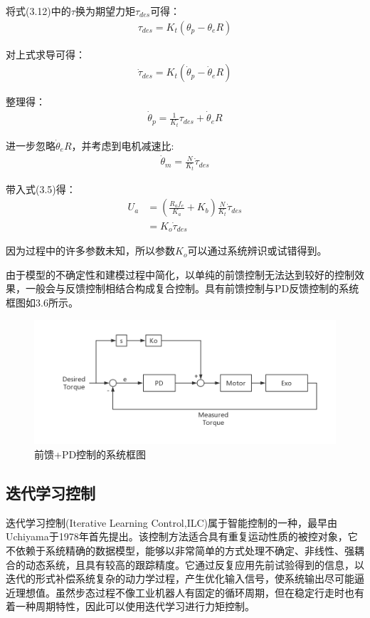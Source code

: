 将式(3.12)中的$\tau$换为期望力矩$\tau_{des}$可得：
\begin{align}
    \tau_{des} = K_t(\theta_p - \theta_eR)
\end{align}

对上式求导可得：
\begin{align}
    \dot\tau_{des} = K_t(\dot\theta_p - \dot\theta_e R)
\end{align}

整理得：
\begin{align}
    \dot\theta_p = \frac{1}{K_t}\tau_{des} + \dot\theta_e R
\end{align}

进一步忽略$\dot\theta_e R$，并考虑到电机减速比:
\begin{align}
    \dot\theta_m = \frac{N}{K_t}\dot\tau_{des}
\end{align}

带入式(3.5)得：
\begin{align}
    U_a &= \left(\frac{R_{a} f_{e}}{K_{a}}+K_{b}\right) \frac{N}{K_t} \dot\tau_{des} \\
        &= K_o \dot\tau_{des}
\end{align}

因为过程中的许多参数未知，所以参数$K_o$可以通过系统辨识或试错得到。

由于模型的不确定性和建模过程中简化，以单纯的前馈控制无法达到较好的控制效果，一般会与反馈控制相结合构成复合控制。具有前馈控制与PD反馈控制的系统框图如3.6所示。
\begin{figure}[htb]
    \includegraphics[width=15cm]{fig/f55.jpg}
    \caption{前馈+PD控制的系统框图}
    \label{fig:mark}
\end{figure}

\subsection{迭代学习控制}

迭代学习控制(Iterative Learning Control,ILC)属于智能控制的一种，最早由Uchiyama\cite{p46}于1978年首先提出。该控制方法适合具有重复运动性质的被控对象，它不依赖于系统精确的数据模型，能够以非常简单的方式处理不确定、非线性、强耦合的动态系统，且具有较高的跟踪精度。它通过反复应用先前试验得到的信息，以迭代的形式补偿系统复杂的动力学过程，产生优化输入信号，使系统输出尽可能逼近理想值。虽然步态过程不像工业机器人有固定的循环周期，但在稳定行走时也有着一种周期特性，因此可以使用迭代学习进行力矩控制。

